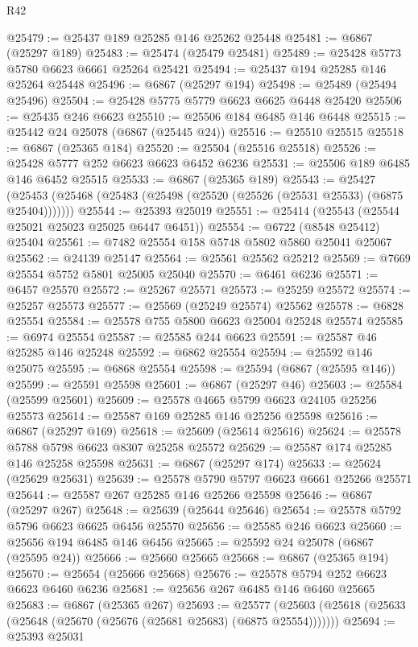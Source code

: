 \begin{lexlean}{R42}
\begin{coremodule}
{@25479 := @25437 @189 @25285 @146 @25262 @25448
@25481 := @6867 (@25297 @189)
@25483 := @25474 (@25479 @25481)
@25489 := @25428 @5773 @5780 @6623 @6661 @25264 @25421
@25494 := @25437 @194 @25285 @146 @25264 @25448
@25496 := @6867 (@25297 @194)
@25498 := @25489 (@25494 @25496)
@25504 := @25428 @5775 @5779 @6623 @6625 @6448 @25420
@25506 := @25435 @246 @6623
@25510 := @25506 @184 @6485 @146 @6448
@25515 := @25442 @24 @25078 (@6867 (@25445 @24))
@25516 := @25510 @25515
@25518 := @6867 (@25365 @184)
@25520 := @25504 (@25516 @25518)
@25526 := @25428 @5777 @252 @6623 @6623 @6452 @6236
@25531 := @25506 @189 @6485 @146 @6452 @25515
@25533 := @6867 (@25365 @189)
@25543 := @25427
    (@25453 (@25468 (@25483 (@25498 (@25520 (@25526 (@25531 @25533) (@6875 @25404)))))))
@25544 := @25393 @25019
@25551 := @25414 (@25543 (@25544 @25021 @25023 @25025 @6447 @6451))
@25554 := @6722 (@8548 @25412) @25404
@25561 := @7482 @25554 @158 @5748 @5802 @5860 @25041 @25067
@25562 := @24139 @25147
@25564 := @25561 @25562 @25212
@25569 := @7669 @25554 @5752 @5801 @25005 @25040
@25570 := @6461 @6236
@25571 := @6457 @25570
@25572 := @25267 @25571
@25573 := @25259 @25572
@25574 := @25257 @25573
@25577 := @25569 (@25249 @25574) @25562
@25578 := @6828 @25554
@25584 := @25578 @755 @5800 @6623 @25004 @25248 @25574
@25585 := @6974 @25554
@25587 := @25585 @244 @6623
@25591 := @25587 @46 @25285 @146 @25248
@25592 := @6862 @25554
@25594 := @25592 @146 @25075
@25595 := @6868 @25554
@25598 := @25594 (@6867 (@25595 @146))
@25599 := @25591 @25598
@25601 := @6867 (@25297 @46)
@25603 := @25584 (@25599 @25601)
@25609 := @25578 @4665 @5799 @6623 @24105 @25256 @25573
@25614 := @25587 @169 @25285 @146 @25256 @25598
@25616 := @6867 (@25297 @169)
@25618 := @25609 (@25614 @25616)
@25624 := @25578 @5788 @5798 @6623 @8307 @25258 @25572
@25629 := @25587 @174 @25285 @146 @25258 @25598
@25631 := @6867 (@25297 @174)
@25633 := @25624 (@25629 @25631)
@25639 := @25578 @5790 @5797 @6623 @6661 @25266 @25571
@25644 := @25587 @267 @25285 @146 @25266 @25598
@25646 := @6867 (@25297 @267)
@25648 := @25639 (@25644 @25646)
@25654 := @25578 @5792 @5796 @6623 @6625 @6456 @25570
@25656 := @25585 @246 @6623
@25660 := @25656 @194 @6485 @146 @6456
@25665 := @25592 @24 @25078 (@6867 (@25595 @24))
@25666 := @25660 @25665
@25668 := @6867 (@25365 @194)
@25670 := @25654 (@25666 @25668)
@25676 := @25578 @5794 @252 @6623 @6623 @6460 @6236
@25681 := @25656 @267 @6485 @146 @6460 @25665
@25683 := @6867 (@25365 @267)
@25693 := @25577
    (@25603 (@25618 (@25633 (@25648 (@25670 (@25676 (@25681 @25683) (@6875 @25554)))))))
@25694 := @25393 @25031
}
\end{coremodule}
\end{lexlean}

